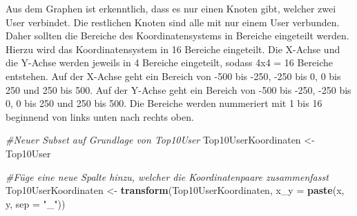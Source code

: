 \documentclass[
]{article}
\newenvironment{Shaded}{\begin{snugshade}}{\end{snugshade}}
\newcommand{\AttributeTok}[1]{\textcolor[rgb]{0.13,0.29,0.53}{#1}}
\newcommand{\CommentTok}[1]{\textcolor[rgb]{0.56,0.35,0.01}{\textit{#1}}}
\newcommand{\FunctionTok}[1]{\textcolor[rgb]{0.13,0.29,0.53}{\textbf{#1}}}
\newcommand{\NormalTok}[1]{#1}
\newcommand{\OtherTok}[1]{\textcolor[rgb]{0.56,0.35,0.01}{#1}}
\newcommand{\StringTok}[1]{\textcolor[rgb]{0.31,0.60,0.02}{#1}}
\begin{document}
Aus dem Graphen ist erkenntlich, dass es nur einen Knoten gibt, welcher
zwei User verbindet. Die restlichen Knoten sind alle mit nur einem User
verbunden. Daher sollten die Bereiche des Koordinatensystems in Bereiche
eingeteilt werden. Hierzu wird das Koordinatensystem in 16 Bereiche
eingeteilt. Die X-Achse und die Y-Achse werden jeweils in 4 Bereiche
eingeteilt, sodass 4x4 = 16 Bereiche entstehen. Auf der X-Achse geht ein
Bereich von -500 bis -250, -250 bis 0, 0 bis 250 und 250 bis 500. Auf
der Y-Achse geht ein Bereich von -500 bis -250, -250 bis 0, 0 bis 250
und 250 bis 500. Die Bereiche werden nummeriert mit 1 bis 16 beginnend
von links unten nach rechts oben.

\begin{Shaded}
\begin{Highlighting}[]
\CommentTok{\#Neuer Subset auf Grundlage von Top10User}
\NormalTok{Top10UserKoordinaten }\OtherTok{\textless{}{-}}\NormalTok{ Top10User}

\CommentTok{\#Füge eine neue Spalte hinzu, welcher die Koordinatenpaare zusammenfasst}
\NormalTok{Top10UserKoordinaten }\OtherTok{\textless{}{-}} \FunctionTok{transform}\NormalTok{(Top10UserKoordinaten, }\AttributeTok{x\_y =} \FunctionTok{paste}\NormalTok{(x, y, }\AttributeTok{sep =} \StringTok{"\_"}\NormalTok{))}


\end{Highlighting}
\end{Shaded}
\end{document}
